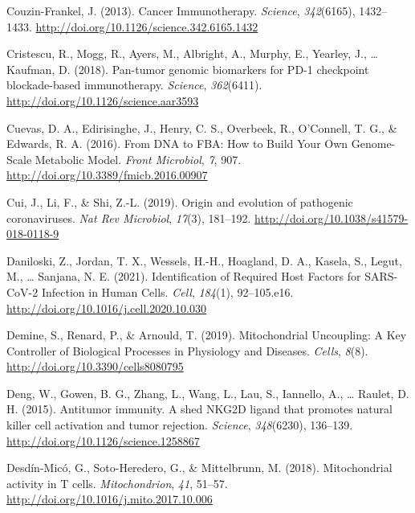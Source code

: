 \documentclass[12pt,twoside,openany,\mydriver]{thesis}  %
\begin{document}
\leavevmode\hypertarget{ref-couzin-frankel_cancer_2013}{}%
Couzin-Frankel, J. (2013). Cancer Immunotherapy. \emph{Science}, \emph{342}(6165), 1432--1433. \url{http://doi.org/10.1126/science.342.6165.1432}

\leavevmode\hypertarget{ref-cristescu_pan-tumor_2018}{}%
Cristescu, R., Mogg, R., Ayers, M., Albright, A., Murphy, E., Yearley, J., \ldots{} Kaufman, D. (2018). Pan-tumor genomic biomarkers for PD-1 checkpoint blockade-based immunotherapy. \emph{Science}, \emph{362}(6411). \url{http://doi.org/10.1126/science.aar3593}

\leavevmode\hypertarget{ref-cuevas_dna_2016}{}%
Cuevas, D. A., Edirisinghe, J., Henry, C. S., Overbeek, R., O'Connell, T. G., \& Edwards, R. A. (2016). From DNA to FBA: How to Build Your Own Genome-Scale Metabolic Model. \emph{Front Microbiol}, \emph{7}, 907. \url{http://doi.org/10.3389/fmicb.2016.00907}

\leavevmode\hypertarget{ref-cui_origin_2019}{}%
Cui, J., Li, F., \& Shi, Z.-L. (2019). Origin and evolution of pathogenic coronaviruses. \emph{Nat Rev Microbiol}, \emph{17}(3), 181--192. \url{http://doi.org/10.1038/s41579-018-0118-9}

\leavevmode\hypertarget{ref-daniloski_identification_2021}{}%
Daniloski, Z., Jordan, T. X., Wessels, H.-H., Hoagland, D. A., Kasela, S., Legut, M., \ldots{} Sanjana, N. E. (2021). Identification of Required Host Factors for SARS-CoV-2 Infection in Human Cells. \emph{Cell}, \emph{184}(1), 92--105.e16. \url{http://doi.org/10.1016/j.cell.2020.10.030}

\leavevmode\hypertarget{ref-demine_mitochondrial_2019}{}%
Demine, S., Renard, P., \& Arnould, T. (2019). Mitochondrial Uncoupling: A Key Controller of Biological Processes in Physiology and Diseases. \emph{Cells}, \emph{8}(8). \url{http://doi.org/10.3390/cells8080795}

\leavevmode\hypertarget{ref-deng_antitumor_2015}{}%
Deng, W., Gowen, B. G., Zhang, L., Wang, L., Lau, S., Iannello, A., \ldots{} Raulet, D. H. (2015). Antitumor immunity. A shed NKG2D ligand that promotes natural killer cell activation and tumor rejection. \emph{Science}, \emph{348}(6230), 136--139. \url{http://doi.org/10.1126/science.1258867}

\leavevmode\hypertarget{ref-desdin-mico_mitochondrial_2018}{}%
Desdín-Micó, G., Soto-Heredero, G., \& Mittelbrunn, M. (2018). Mitochondrial activity in T cells. \emph{Mitochondrion}, \emph{41}, 51--57. \url{http://doi.org/10.1016/j.mito.2017.10.006}
\end{document}
